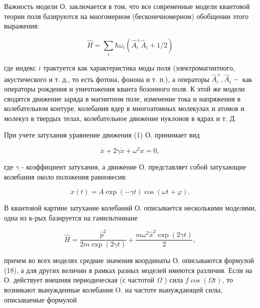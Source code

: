 \documentclass[10pt]{article}
\begin{document}
Важность модели О. заключается в том, что все современные модели квантовой теории поля базируются на многомерном (бесконечномерном) обобщении этого выражения:



\[

\hat{H}=\sum_{i} \hbar \omega_{i}\left(\hat{A}_{i}^{+} \hat{A}_{i}+1 / 2\right)

\]



где индекс $i$ трактуется как характеристика моды поля (электромагнитного, акустического и т. д., то есть фотона, фонона и т. п.), а операторы $\hat{A}_{i}^{+}, \hat{A}_{i}-$ как операторы рождения и уничтожения кванта бозонного поля. К этой же модели сводятся движение заряда в магнитном поле, изменение тока и напряжения в колебательном контуре, колебания ядер в многоатомных молекулах и атомов и молекул в твердых телах, колебательное движение нуклонов в ядрах и т. Д.



При учете затухания уравнение движения (1) О. принимает вид



\[

\ddot{x}+2 \gamma \dot{x}+\omega^{2} x=0,

\]



где $\gamma$ - коэффициент затухания, а движение О. представляет собой затухающие колебания около положения равновесия:



\[

x(t)=A \exp (-\gamma t) \cos (\omega t+\varphi) .

\]



В квантовой картине затухание колебаний О. описывается несколькими моделями, одна из к-рых базируется на гамильтониане



\[

\hat{H}=\frac{\hat{p}^{2}}{2 m \exp (2 \gamma t)}+\frac{m \omega^{2} \hat{x}^{2} \exp (2 \gamma t)}{2},

\]



причем во всех моделях средние значения координаты О. описываются формулой (18), а для других величин в рамках разных моделей имеются различия. Если на О. действует внешняя периодическая (с частотой $\Omega$ ) сила $f \cos (\Omega t)$, то возникают вынужденные колебания $\mathrm{O}$. на частоте вынуждающей силы, описываемые формулой
\end{document}
